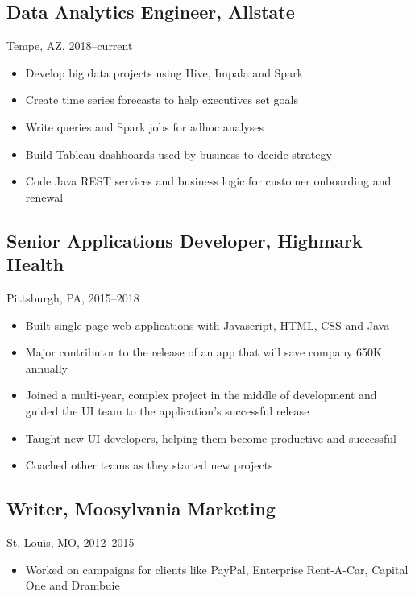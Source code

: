 \documentclass[11pt]{article}
\begin{document}
	\subsection{\normalsize{Data Analytics Engineer, Allstate}}
	{\fontsize{10pt}{\parskip}\selectfont Tempe, AZ, 2018--current}
	\begin{itemize}
	\item Develop big data projects using Hive, Impala and Spark
	\item Create time series forecasts to help executives set goals
	\item Write queries and Spark jobs for adhoc analyses
	\item Build Tableau dashboards used by business to decide strategy
	\item Code Java REST services and business logic for customer onboarding and renewal
	\end{itemize}

	 \subsection{\normalsize{Senior Applications Developer, Highmark Health}}
		{\fontsize{10pt}{\parskip}\selectfont Pittsburgh, PA, 2015--2018}
		\begin{itemize}
		\item Built single page web applications with Javascript, HTML, CSS and Java
		\item Major contributor to the release of an app that will save company 650K annually
		\item Joined a multi-year, complex project in the middle of development and guided the UI team to the application's successful release
		\item Taught new UI developers, helping them become productive and successful
		\item Coached other teams as they started new projects
		\end{itemize}

	\subsection{\normalsize{Writer, Moosylvania Marketing}}
	{\fontsize{10pt}{\parskip}\selectfont St. Louis, MO, 2012--2015}
	\begin{itemize}
		\item Worked on campaigns for clients like PayPal, Enterprise Rent-A-Car, Capital One and Drambuie
	\end{itemize}
\end{document}

